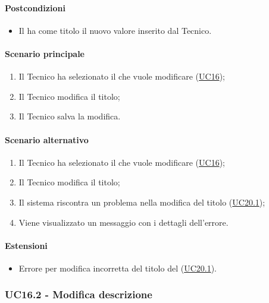 \paragraph*{Postcondizioni}
\begin{itemize}
  \item Il  ha come titolo il nuovo valore inserito dal Tecnico.
\end{itemize}

\paragraph*{Scenario principale}
\begin{enumerate}
  \item Il Tecnico ha selezionato il  che vuole modificare (\hyperref[UC16]{UC16});
  \item Il Tecnico modifica il titolo;
  \item Il Tecnico salva la modifica.
\end{enumerate}

\paragraph*{Scenario alternativo}
\begin{enumerate}
  \item Il Tecnico ha selezionato il  che vuole modificare (\hyperref[UC16]{UC16});
  \item Il Tecnico modifica il titolo;
  \item Il sistema riscontra un problema nella modifica del titolo (\hyperref[UC20point1]{UC20.1});
  \item Viene visualizzato un messaggio con i dettagli dell'errore.
\end{enumerate}

\paragraph*{Estensioni}
\begin{itemize}
  \item Errore per modifica incorretta del titolo del  (\hyperref[UC20point1]{UC20.1}).
\end{itemize}


\subsubsection{UC16.2 - Modifica descrizione }\label{UC16point2}
